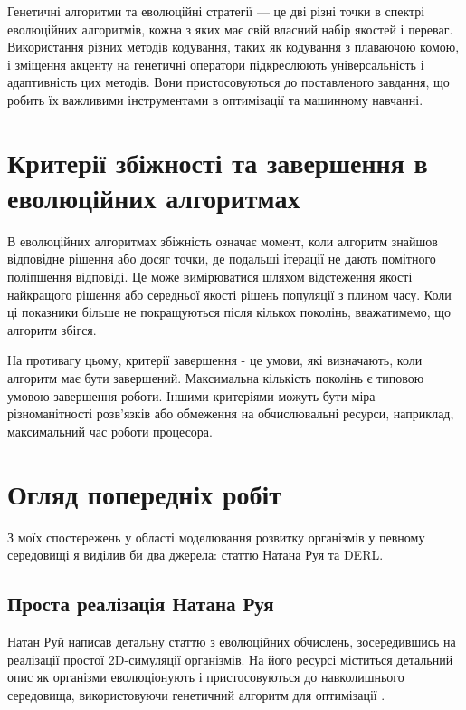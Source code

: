 Генетичні алгоритми та еволюційні стратегії --- це дві різні 
точки в спектрі еволюційних алгоритмів, кожна з яких має 
свій власний набір якостей і переваг. 
Використання різних методів кодування, 
таких як кодування з плаваючою комою, 
і зміщення акценту на генетичні оператори підкреслюють 
універсальність і адаптивність цих методів. 
Вони пристосовуються до поставленого завдання, 
що робить їх важливими інструментами в оптимізації та машинному навчанні.



\section{Критерії збіжності та завершення в еволюційних алгоритмах}

В еволюційних алгоритмах збіжність означає момент, 
коли алгоритм знайшов відповідне рішення або досяг точки, 
де подальші ітерації не дають помітного поліпшення відповіді. 
Це може вимірюватися шляхом відстеження якості найкращого 
рішення або середньої якості рішень популяції з плином часу. 
Коли ці показники більше не покращуються після кількох поколінь, 
вважатимемо, що алгоритм збігся.

На противагу цьому, критерії завершення - це умови,
які визначають, коли алгоритм має бути завершений. 
Максимальна кількість поколінь є типовою умовою завершення роботи.
Іншими критеріями можуть бути міра різноманітності 
розв'язків або обмеження на обчислювальні ресурси, 
наприклад, максимальний час роботи процесора.


\section{Огляд попередніх робіт}

З моїх спостережень у області моделювання розвитку організмів у певному
середовищі я виділив би два джерела: 
статтю Натана Руя \cite{rooy_evolving_nodate} та DERL.

\subsection{Проста реалізація Натана Руя}

Натан Руй написав детальну статтю з еволюційних обчислень, зосередившись на
реалізації простої 2D-симуляції організмів.
На його ресурсі міститься детальний опис як організми еволюціонують і
пристосовуються до навколишнього середовища, використовуючи генетичний
алгоритм для оптимізації \cite{rooy_evolving_nodate}.


